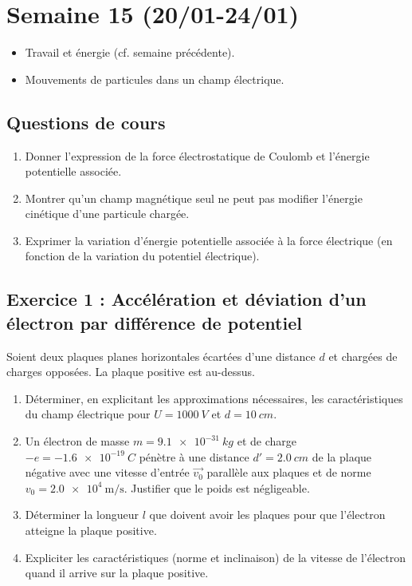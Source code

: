 \section{Semaine 15 (20/01-24/01) }


\begin{itemize}
	\item Travail et énergie (cf. semaine précédente).
	\item Mouvements de particules dans un champ électrique.
\end{itemize}

\subsection{Questions de cours}

\begin{enumerate}
	\item Donner l'expression de la force électrostatique de Coulomb et l'énergie potentielle associée.
	\item Montrer qu'un champ magnétique seul ne peut pas modifier l'énergie cinétique d'une particule chargée.
	\item Exprimer la variation d'énergie potentielle associée à la force électrique (en fonction de la variation du potentiel électrique).
	
\end{enumerate}

\subsection{Exercice 1 : Accélération et déviation d'un électron par différence de potentiel}

Soient deux plaques planes horizontales écartées d'une distance $d$ et chargées de charges opposées. La plaque positive est au-dessus.

\begin{enumerate}
	\item Déterminer, en explicitant les approximations nécessaires, les caractéristiques du champ électrique pour $U = \SI{1000}{V}$ et $d = \SI{10}{cm}$.
	\item Un électron de masse $m = \SI{9.1e-31}{kg}$ et de charge $-e = -\SI{1.6e-19}{C}$ pénètre à une distance $d' = \SI{2.0}{cm}$ de la plaque négative avec une vitesse d'entrée $\vec{v_0}$ parallèle aux plaques et de norme $v_0 = \SI{2.0e4}{\meter\per\second}$. Justifier que le poids est négligeable.
	\item Déterminer la longueur $l$ que doivent avoir les plaques pour que l'électron atteigne la plaque positive.
	\item Expliciter les caractéristiques (norme et inclinaison) de la vitesse de l'électron quand il arrive sur la plaque positive.
\end{enumerate}

